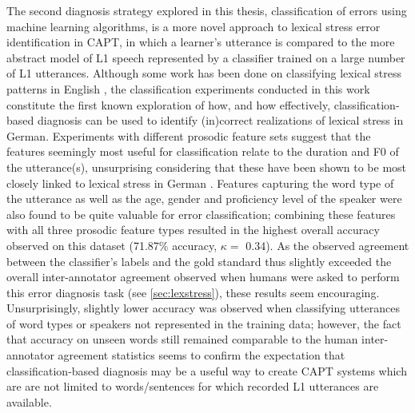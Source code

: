 \documentclass[11pt,a4paper,onecolumn]{article}
\newcommand{\TODO}[1]{{\color{red}\textbf{[TODO #1]}}}
\begin{document}
	The second diagnosis strategy explored in this thesis, classification of errors using machine learning algorithms, is a more novel approach to lexical stress error identification in CAPT, in which a learner's utterance is compared to the more abstract model of L1 speech represented by a classifier trained on a large number of L1 utterances. Although some work has been done on classifying lexical stress patterns in English \citep{Shahin2012a,Kim2011}, the classification experiments conducted in this work %
	constitute %
	the first known exploration of how, and how effectively, classification-based diagnosis can be used to identify (in)correct realizations of lexical stress in German. 
	Experiments with different prosodic feature sets 
	suggest that the features seemingly most useful for classification relate to the duration and F0 of the utterance(s), unsurprising considering that these have been shown to be most closely linked to lexical stress in German \citep{Cutler2005,Dogil1999}. Features capturing the word type of the utterance as well as the age, gender and proficiency level of the speaker were also found to be quite valuable for error classification; combining these features with all three prosodic feature types resulted in the highest overall accuracy observed on this dataset (71.87\% accuracy, $\kappa=$ 0.34). As the observed agreement between the classifier's labels and the gold standard thus slightly exceeded the overall inter-annotator agreement observed when humans were asked to perform this error diagnosis task (see \cref{sec:lexstress}), these results seem encouraging. Unsurprisingly, slightly lower accuracy was observed when classifying utterances of word types or speakers not represented in the training data; however, the fact that accuracy on unseen words still remained comparable to the human inter-annotator agreement statistics seems to confirm the expectation that classification-based diagnosis may be a useful way to create CAPT systems which are are not limited to words/sentences for which recorded L1 utterances are available.
	
\end{document}
